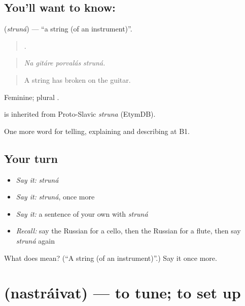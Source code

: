 \subsection*{You'll want to know: }
\textbf{} (\emph{struná}) — \textquotedblleft{}a string (of an instrument)\textquotedblright{}.

\begin{quote}
   .
\end{quote}

\begin{quote}
\emph{Na gitáre porvalás struná.}
\end{quote}

\begin{quote}
A string has broken on the guitar.
\end{quote}

Feminine; plural .

\begin{cousinweb}
\emph{} is inherited from Proto-Slavic \emph{struna} (EtymDB).
\end{cousinweb}

\begin{grammarlens}[title={What you've built}]
One more word for telling, explaining and describing at B1.
\end{grammarlens}

\subsection*{Your turn}
\begin{itemize}
\raggedright
  \item \emph{Say it:} \emph{struná}
  \item \emph{Say it:} \emph{struná}, once more
  \item \emph{Say it:} a sentence of your own with \emph{struná}
  \item \emph{Recall:} say the Russian for a cello, then the Russian for a flute, then say \emph{struná} again
\end{itemize}

\begin{tcolorbox}[breakable,colback=teal!4,colframe=teal!35!black,title={Before you move on}]
What does  mean? (\textquotedblleft{}A string (of an instrument)\textquotedblright{}.) Say it once more.
\end{tcolorbox}
\section[\texorpdfstring{\ru{настраивать} (nastráivat)}{настраивать (nastráivat)}]{ (nastráivat) — to tune; to set up}

